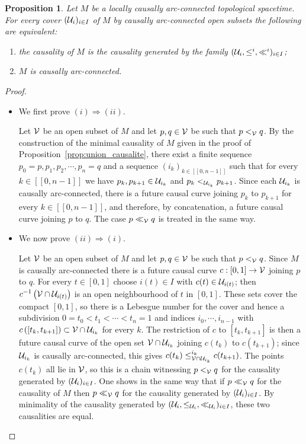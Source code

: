\documentclass[a4paper,twoside]{article}
\providecommand{\lsem}{[\![}
\providecommand{\rsem}{]\!]}
\newtheorem{prop}[lem]{Proposition}
\begin{document}
\begin{prop}\label{prop:cac_engendre} Let $M$ be a locally causally arc-connected topological spacetime.
For every cover $(\mathcal{U}_i)_{i\in I}$ of $M$ by causally arc-connected open subsets the following are equivalent:
\begin{enumerate}[label=(\roman*)]
\item the causality of $M$ is the causality generated by the family $(\mathcal{U}_i,\leq^i,\ll^i)_{i\in I}$;
\item $M$ is causally arc-connected.
\end{enumerate}
\end{prop}
\begin{proof}\
\begin{itemize}
\item We first prove $(i)\Rightarrow (ii)$.

Let $\mathcal V$ be an open subset of $M$ and let $p,q\in \mathcal V$ be such that $p<_\mathcal V q$. By the construction of the minimal causality of $M$ given in
the proof of Proposition~\ref{prop:union_causalite}, there exist a finite sequence $p_0=p,p_1,p_2,\cdots,p_n=q$
and a sequence $(i_{k})_{k\in \lsem 0,n-1\rsem}$
such that for every $k\in \lsem 0,n-1\rsem$ we have $p_k,p_{k+1}\in \mathcal{U}_{i_k}$ and $p_k<_{\mathcal{U}_{i_k}} p_{k+1}$.
Since each $\mathcal{U}_{i_k}$ is causally arc-connected, there is a future causal curve joining
$p_{k}$ to $p_{k+1}$ for every $k\in \lsem 0,n-1\rsem$, and therefore, by concatenation, a future causal curve joining $p$
to $q$. The case $p\ll_\mathcal V q$ is treated in the same way.
\item We now prove $(ii)\Rightarrow (i)$.

Let $\mathcal V$ be an open subset of $M$ and let $p,q\in \mathcal V$ be such that $p<_\mathcal V q$.
Since $M$ is causally arc-connected there is a future causal curve $c:[0,1]\rightarrow \mathcal V$ joining $p$ to $q$.
For every $t\in[0,1]$ choose $i(t)\in I$ with $c(t)\in \mathcal{U}_{i(t)}$; then $c^{-1}\left(\mathcal V\cap \mathcal{U}_{i(t)}\right)$ is an open
neighbourhood of $t$ in $[0,1]$. These sets cover the compact $[0,1]$, so there is a Lebesgue number for the cover and hence
a subdivision $0=t_0<t_1<\cdots<t_n=1$ and indices $i_0,\cdots,i_{n-1}$ with
$c\left([t_k,t_{k+1}]\right)\subset \mathcal V\cap \mathcal{U}_{i_k}$ for every $k$.
The restriction of $c$ to $[t_k,t_{k+1}]$ is then a future causal curve of the open set $\mathcal V\cap \mathcal{U}_{i_k}$ joining
$c(t_k)$ to $c(t_{k+1})$; since $\mathcal{U}_{i_k}$ is causally arc-connected, this gives
$c(t_k)\leq^{i_k}_{\mathcal V\cap \mathcal{U}_{i_k}} c(t_{k+1})$.
The points $c(t_k)$ all lie in $\mathcal V$, so this is a chain witnessing $p<_\mathcal V q$ for the causality generated by $(\mathcal{U}_i)_{i\in I}$.
One shows in the same way that if $p\ll_\mathcal V q$ for the causality of $M$ then $p\ll_{\mathcal V}q$ for the causality
generated by $(\mathcal{U}_i)_{i\in I}$.
By minimality of the causality generated
by $(\mathcal{U}_i,\leq_{\mathcal{U}_i},\ll_{\mathcal{U}_i})_{i\in I}$, these two causalities are equal.
\end{itemize}
\end{proof}
\end{document}
